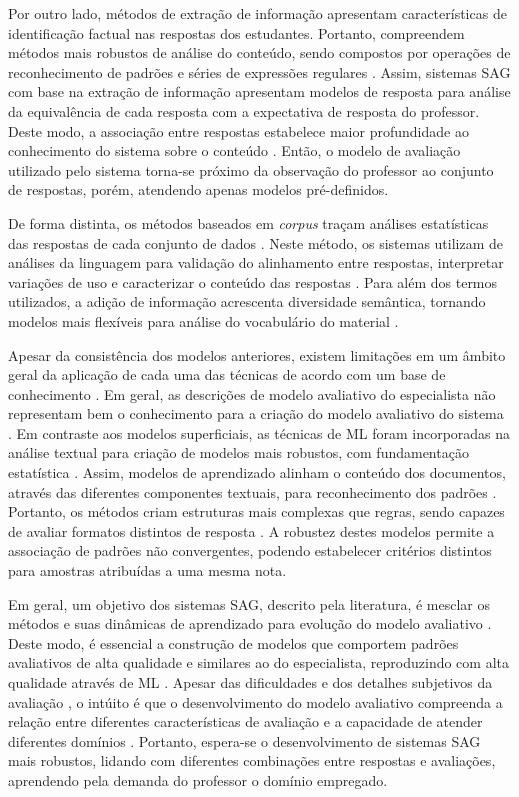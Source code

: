 Por outro lado, métodos de extração de informação apresentam características de identificação factual nas respostas dos estudantes. Portanto, compreendem métodos mais robustos de análise do conteúdo, sendo compostos por operações de reconhecimento de padrões e séries de expressões regulares \cite{ramachandran2015b, butcher2010}. Assim, sistemas SAG com base na extração de informação apresentam modelos de resposta para análise da equivalência de cada resposta com a expectativa de resposta do professor. Deste modo, a associação entre respostas estabelece maior profundidade ao conhecimento do sistema sobre o conteúdo \cite{tan2020}. Então, o modelo de avaliação utilizado pelo sistema torna-se próximo da observação do professor ao conjunto de respostas, porém, atendendo apenas modelos pré-definidos.

De forma distinta, os métodos baseados em \textit{corpus} traçam análises estatísticas das respostas de cada conjunto de dados \cite{kumar2019}. Neste método, os sistemas utilizam de análises da linguagem para validação do alinhamento entre respostas, interpretar variações de uso e caracterizar o conteúdo das respostas \cite{ziai2012, menini2019}. Para além dos termos utilizados, a adição de informação acrescenta diversidade semântica, tornando modelos mais flexíveis para análise do vocabulário do material \cite{fowler2021}.

Apesar da consistência dos modelos anteriores, existem limitações em um âmbito geral da aplicação de cada uma das técnicas de acordo com um base de conhecimento \cite{riordan2019, ding2020}. Em geral, as descrições de modelo avaliativo do especialista não representam bem o conhecimento para a criação do modelo avaliativo do sistema \cite{filighera2020}. Em contraste aos modelos superficiais, as técnicas de ML foram incorporadas na análise textual para criação de modelos mais robustos, com fundamentação estatística \cite{galhardi2018b}. Assim, modelos de aprendizado alinham o conteúdo dos documentos, através das diferentes componentes textuais, para reconhecimento dos padrões \cite{suzen2020}. Portanto, os métodos criam estruturas mais complexas que regras, sendo capazes de avaliar formatos distintos de resposta \cite{zhang2016, saha2019, camus2020}. A robustez destes modelos permite a associação de padrões não convergentes, podendo estabelecer critérios distintos para amostras atribuídas a uma mesma nota.

Em geral, um objetivo dos sistemas SAG, descrito pela literatura, é mesclar os métodos e suas dinâmicas de aprendizado para evolução do modelo avaliativo \cite{burrows2015, zesch2018}. Deste modo, é essencial a construção de modelos que comportem padrões avaliativos de alta qualidade e similares ao do especialista, reproduzindo com alta qualidade através de ML \cite{jordan2012}. Apesar das dificuldades e dos detalhes subjetivos da avaliação \cite{roy2018}, o intúito é que o desenvolvimento do modelo avaliativo compreenda a relação entre diferentes características de avaliação e a capacidade de atender diferentes domínios \cite{sung2019a, saha2019}. Portanto, espera-se o desenvolvimento de sistemas SAG mais robustos, lidando com diferentes combinações entre respostas e avaliações, aprendendo pela demanda do professor o domínio empregado.